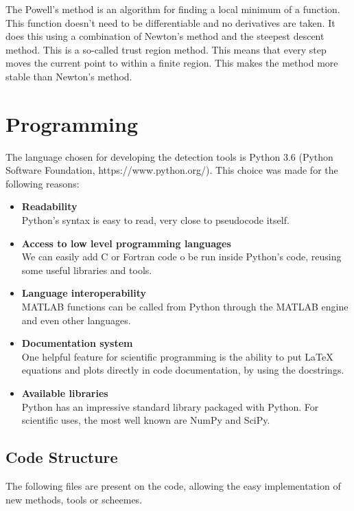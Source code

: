 \documentclass[12pt, a4paper, openany]{memoir}
\begin{document}
The Powell's method is an algorithm for finding a local minimum of a function. This function doesn't need to be differentiable and no derivatives are taken. It does this using a combination of Newton's method and the steepest descent method. This is a so-called trust region method. This means that every step moves the current point to within a finite region. This makes the method more stable than Newton's method.

\section{Programming}

The language chosen for developing the detection tools is Python 3.6 (Python Software Foundation, https://www.python.org/). This choice was made for the following reasons:
\begin{itemize}
	\item \textbf{Readability} \\
	Python's syntax is easy to read, very close to pseudocode itself.
	\item \textbf{Access to low level programming languages} \\
	We can easily add C or Fortran code o be run inside Python's code, reusing some useful libraries and tools.
	\item \textbf{Language interoperability} \\
	MATLAB functions can be called from Python through the MATLAB engine and even other languages.
	\item \textbf{Documentation system} \\
	One helpful feature for scientific programming is the ability to put LaTeX equations and plots directly in code documentation, by using the docstrings.
	\item \textbf{Available libraries} \\
	Python has an impressive standard library packaged with Python. For scientific uses, the most well known are NumPy and SciPy.
\end{itemize} 

\newpage
\subsection{Code Structure}

The following files are present on the code, allowing the easy implementation of new methods, tools or scheemes.
\end{document}
